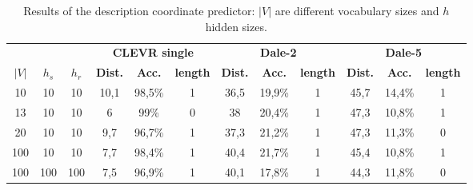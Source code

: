 \begin{table}[ht]
    \centering
    \begin{tabular}{ccc|ccc|ccc|ccc}
        \toprule
              &         &         & \multicolumn{3}{c}{\textbf{CLEVR single}} & \multicolumn{3}{c}{\textbf{Dale-2}} & \multicolumn{3}{c}{\textbf{Dale-5}}                                                                                                       \\\cmidrule(lr){4-6}\cmidrule(lr){7-9}\cmidrule(lr){10-12}
        $|V|$ & $h_{s}$ & $h_{r}$ & \textbf{Dist.}                            & \textbf{Acc.}                       & \textbf{length}                     & \textbf{Dist.} & \textbf{Acc.} & \textbf{length} & \textbf{Dist.} & \textbf{Acc.} & \textbf{length} \\\midrule
        {10}  & {10}    & {10}    & {10,1}                                    & {98,5\%}                            & {1}                                 & {36,5}         & {19,9\%}      & {1}             & {45,7}         & {14,4\%}      & {1}             \\
        {13}  & {10}    & {10}    & {6}                                       & {99\%}                              & {0}                                 & {38}           & {20,4\%}      & {1}             & {47,3}         & {10,8\%}      & {1}             \\
        {20}  & {10}    & {10}    & {9,7}                                     & {96,7\%}                            & {1}                                 & {37,3}         & {21,2\%}      & {1}             & {47,3}         & {11,3\%}      & {0}             \\
        {100} & {10}    & {10}    & {7,7}                                     & {98,4\%}                            & {1}                                 & {40,4}         & {21,7\%}      & {1}             & {45,4}         & {10,8\%}      & {1}             \\
        {100} & {100}   & {100}   & {7,5}                                     & {96,9\%}                            & {1}                                 & {40,1}         & {17,8\%}      & {1}             & {44,3}         & {11,8\%}      & {0}             \\
        \bottomrule
    \end{tabular}
    \caption{Results of the description coordinate predictor: $|V|$ are different vocabulary sizes and $h$ hidden sizes.}
    \label{tab:results_dale_predictor_game}
\end{table}

